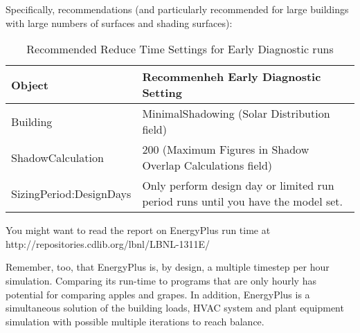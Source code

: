 Specifically, recommendations (and particularly recommended for large buildings with large numbers of surfaces and shading surfaces):

\begin{longtable}[c]{p{1.5in}p{4.5in}}
\caption{Recommended Reduce Time Settings for Early Diagnostic runs \protect \label{table:recommended-reduce-time-settings-for-early}}\\
\toprule 
Object & Recommenheh Early Diagnostic Setting \tabularnewline \midrule
\endhead
Building & MinimalShadowing (Solar Distribution field) \tabularnewline
ShadowCalculation & 200 (Maximum Figures in Shadow Overlap Calculations field) \tabularnewline
SizingPeriod:DesignDays & Only perform design day or limited run period runs until you have the model set. \tabularnewline
\bottomrule
\end{longtable}

You might want to read the report on EnergyPlus run time at http://repositories.cdlib.org/lbnl/LBNL-1311E/

Remember, too, that EnergyPlus is, by design, a multiple timestep per hour simulation. Comparing its run-time to programs that are only hourly has potential for comparing apples and grapes. In addition, EnergyPlus is a simultaneous solution of the building loads, HVAC system and plant equipment simulation with possible multiple iterations to reach balance.
